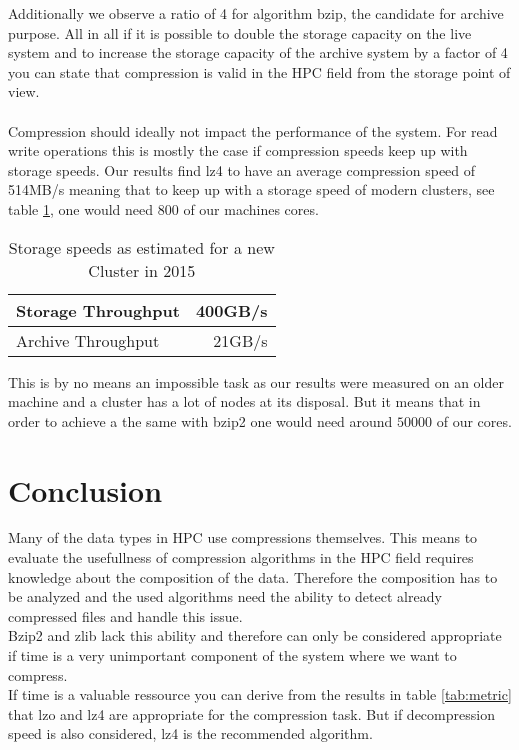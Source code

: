 \documentclass[
	12pt,
	a4paper,
	BCOR10mm,
	DIV14,
	listof=totoc,
	bibliography=totoc,
	headsepline
]{scrreprt}
\begin{document}
Additionally we observe a ratio of 4 for algorithm bzip, the candidate for archive purpose.
All in all if it is possible to double the storage capacity on the live system and to increase the storage capacity of the archive system by a factor of 4 you can state that compression is valid in the HPC field from the storage point of view.
\\ \\
\newpage
Compression should ideally not impact the performance of the system. 
For read write operations this is mostly the case if compression speeds keep up with storage speeds.
Our results find lz4 to have an average compression speed of 514MB/s meaning that to keep up with a storage speed of modern clusters, see table \ref{tab:storage_speeds}, one would need 800 of our machines cores. 
\begin{table}[h]
\begin{center}
\begin{tabular}{|l|r|}
    \hline
    Storage Throughput & 400GB/s \\
    \hline
    Archive Throughput &  21GB/s \\
    \hline
\end{tabular}
\caption{Storage speeds as estimated for a new Cluster in 2015 \cite{ExaStoSy}}
\label{tab:storage_speeds}
\end{center}
\end{table}
\FloatBarrier

This is by no means an impossible task as our results were measured on an older machine and a cluster has a lot of nodes at its disposal. But it means that in order to achieve a the same with bzip2 one would need around $50000$ of our cores.
\\


\chapter{Conclusion}
\label{Conclusion}
Many of the data types in HPC use compressions themselves.
This means to evaluate the usefullness of compression algorithms in the HPC field requires knowledge about the composition of the data.
Therefore the composition has to be analyzed and the used algorithms need the ability to detect already compressed files and handle this issue.
\\
Bzip2 and zlib lack this ability and therefore can only be considered appropriate if time is a very unimportant component of the system where we want to compress.
\\
If time is a valuable ressource you can derive from the results in table \ref{tab:metric} that lzo and lz4 are appropriate for the compression task. 
But if decompression speed is also considered, lz4 is the recommended algorithm.
\end{document}
